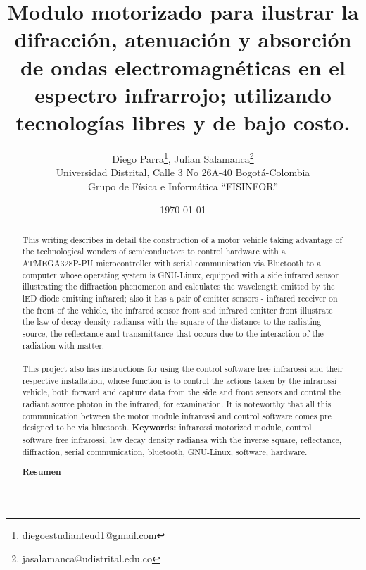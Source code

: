 \documentclass[12]{article}
\title{\bf{Modulo motorizado para ilustrar la difracción, atenuación y absorción de ondas electromagnéticas en el espectro infrarrojo; utilizando tecnologías libres y de bajo costo.}}
\author{Diego Parra\footnote{diegoestudianteud1@gmail.com}, Julian Salamanca\footnote{jasalamanca@udistrital.edu.co} \\
  Universidad Distrital, Calle 3 No 26A-40 Bogotá-Colombia\\
  Grupo de Física e Informática ``FISINFOR''
}
\date{\today}
\def\tablename{Tabla}%
\begin{document}
\renewcommand{\tablename}{Tabla}
\maketitle
\vspace{-0.8cm}
\begin{abstract}

This writing describes in detail the construction of a motor vehicle taking advantage of the technological wonders of semiconductors to control hardware with a ATMEGA328P-PU microcontroller with serial communication via Bluetooth to a computer whose operating system is GNU-Linux, equipped with a side infrared sensor illustrating the diffraction phenomenon and calculates the wavelength emitted by the lED diode emitting infrared; also it has a pair of emitter sensors - infrared receiver on the front of the vehicle, the infrared sensor front and infrared emitter front illustrate the law of decay density radiansa with the square of the distance to the radiating source, the reflectance and transmittance that occurs due to the interaction of the radiation with matter. \\\\
This project also has instructions for using the control software free infrarossi and their respective installation, whose function is to control the actions taken by the infrarossi vehicle, both forward and capture data from the side and front sensors and control the radiant source photon in the infrared, for examination. It is noteworthy that all this communication between the motor module infrarossi and control software comes pre designed to be via bluetooth.
{\bf{Keywords:}} infrarossi motorized module,  control software free infrarossi, law decay density radiansa with the inverse square, reflectance, diffraction, serial communication, bluetooth, GNU-Linux, software, hardware.
\begin{center}
{\bf{Resumen}} 
\end{center}
  

\end{abstract}
\end{document}
